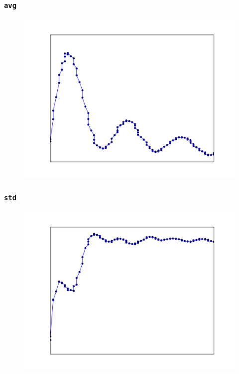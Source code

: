 \documentclass{beamer}
\begin{document}
  \begin{frame}[foot]
    \frametitle{\texttt{avg}}
    \begin{figure}
      \includegraphics[scale=.5]{./gfx/feature1.png}
    \end{figure}
  \end{frame}

  \begin{frame}[foot]
    \frametitle{\texttt{std}}
    \begin{figure}
      \includegraphics[scale=.5]{./gfx/feature2.png}
    \end{figure}
  \end{frame}
\end{document}
